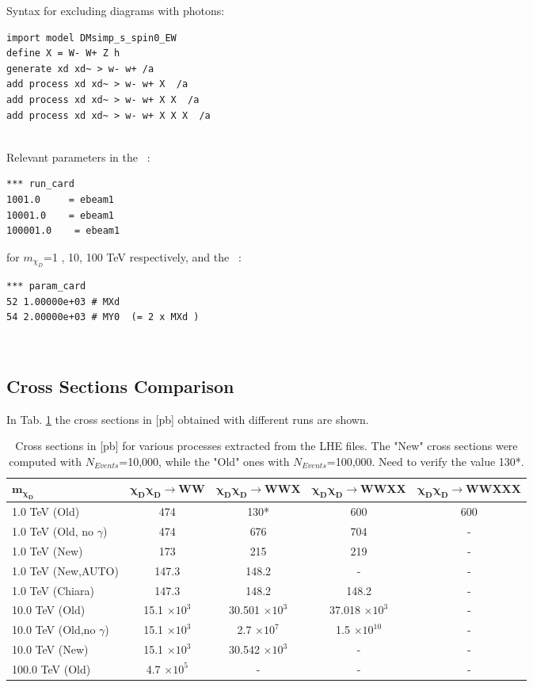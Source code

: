 \documentclass[epj,nopacs,fleqn]{svjour}
\begin{document}
Syntax for excluding diagrams with photons:
\begin{verbatim}
import model DMsimp_s_spin0_EW
define X = W- W+ Z h
generate xd xd~ > w- w+ /a
add process xd xd~ > w- w+ X  /a
add process xd xd~ > w- w+ X X  /a
add process xd xd~ > w- w+ X X X  /a
\end{verbatim}
\\

Relevant parameters in the \run~: 
\begin{verbatim}
*** run_card
1001.0     = ebeam1  
10001.0    = ebeam1  
100001.0    = ebeam1 
\end{verbatim}
for  $m_{\chi_D}$=1 , 10, 100 TeV respectively, and the \param~:
\begin{verbatim}
*** param_card
52 1.00000e+03 # MXd 
54 2.00000e+03 # MY0  (= 2 x MXd )   
\end{verbatim}
\\

\subsection{Cross Sections Comparison}
In Tab. \ref{xsec} the cross sections in [pb] obtained with different runs are shown.
\begin{table}[!h]
\centering
\renewcommand{\arraystretch}{1.2}
\small
\begin{tabular}{ l | c | c | c | c } \toprule \toprule 
$\mathbf{m_{\chi_D}} $ & $\mathbf{\chi _D \chi _D \rightarrow WW} $ & $\mathbf{\chi _D \chi _D \rightarrow WW X} $ & $\mathbf{\chi _D \chi _D \rightarrow WWX X }$ & $\mathbf{\chi _D \chi _D \rightarrow WW X X X}$ \\  \toprule 
    1.0 TeV (Old) & 474 & 130* & 600 & 600 \\  
    1.0 TeV (Old, no $\gamma$) & 474 & 676 & 704 & - \\  
    1.0 TeV (New) & 173 & 215 & 219 & - \\  
    1.0 TeV (New,AUTO) & 147.3 & 148.2 & - & - \\    

    1.0 TeV (Chiara) & 147.3 & 148.2 & 148.2 & - \\    

  
  10.0 TeV (Old)  & 15.1 $\times 10 ^3$ & 30.501 $\times 10 ^3$ & 37.018 $\times 10 ^3$ & - \\ 
  10.0 TeV (Old,no $\gamma$)  & 15.1 $\times 10^3$  & 2.7 $\times 10 ^7$ & 1.5 $\times 10^{10}$ & - \\ 

  10.0 TeV (New)  & 15.1 $\times 10 ^3$ & 30.542 $\times 10 ^3$  & - & - \\    
  100.0 TeV (Old) & 4.7  $\times 10 ^5$  & - & - & - \\  



    \bottomrule \bottomrule
  \end{tabular}
  \caption{Cross sections in [pb]  for various processes extracted from the LHE files. The "New" cross sections were computed with $N_{Events}$=10,000, while the "Old" ones with $N_{Events}$=100,000. Need to verify the value 130*. }
  \label{xsec}
\end{table}
\end{document}
